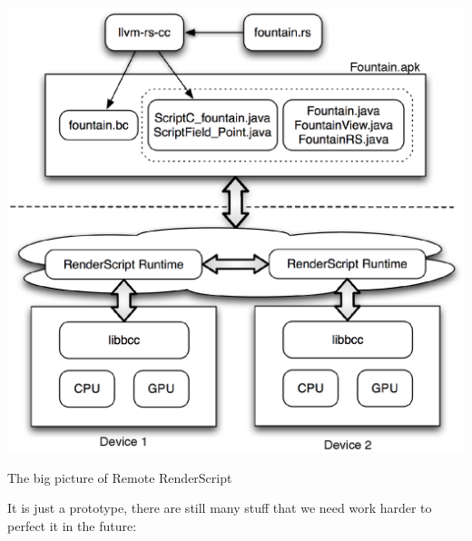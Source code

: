 \begin{center-figure}
	\includegraphics[scale=0.8]{fig/Future_RRS.eps}
	\caption{The big picture of Remote RenderScript}
	\label{fig:Future_RRS}
\end{center-figure}

It is just a \RRS{} prototype, there are still many stuff that we need work harder to perfect it in the future:

